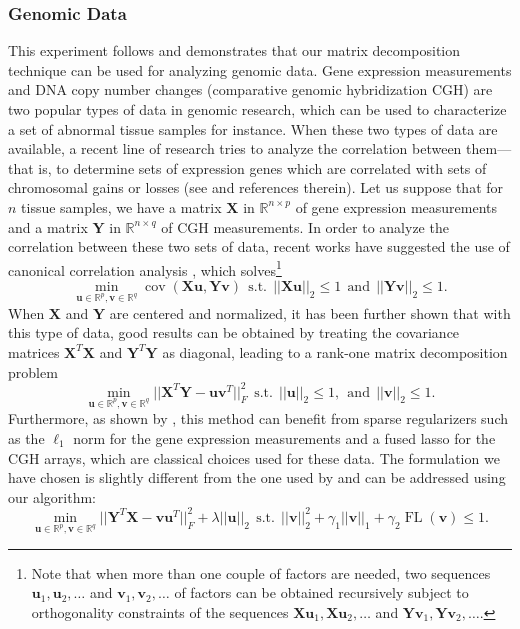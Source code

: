 \documentclass[twoside,11pt]{article}
\def\v{{\mathbf v}}
\def\X{{\mathbf X}}
\def\Y{{\mathbf Y}}
\def\u{{\mathbf u}}
\def\Real{{\mathbb R}}
\def\u{{\mathbf u}}
\def\FL{\operatorname{FL}}
\def\cov{\operatorname{cov}}
\def\st{~~\text{s.t.}~~}
\begin{document}
\subsubsection{Genomic Data}
This experiment follows \citet{witten} and demonstrates that our matrix
decomposition technique can be used for analyzing genomic data.
Gene expression measurements and DNA copy number changes (comparative genomic hybridization CGH) are two popular
types of data in genomic research, which can be used to characterize
a set of abnormal tissue samples for instance.
When these two types of data are available, a recent line of research
tries to analyze the correlation between them---that is, to determine
sets of expression genes which are correlated with sets of chromosomal
gains or losses (see \citealp{witten} and references therein).
Let us suppose that for $n$ tissue samples, we have a matrix $\X$ in $\Real^{n
\times p}$ of gene expression measurements and a matrix $\Y$ in $\Real^{n
\times q}$ of CGH measurements. In order to analyze the
correlation between these two sets of data, recent works have suggested the
use of canonical correlation analysis \citep{hotelling}, which
solves\footnote{Note that when more than one couple of factors are needed, two
sequences
$\u_1,\u_2,\ldots$ and $\v_1,\v_2,\ldots$ of factors can be obtained
recursively subject to orthogonality constraints of the sequences
$\X\u_1,\X\u_2,\ldots$ and $\Y\v_1,\Y\v_2,\ldots$.}
\begin{displaymath}
   \min_{\u \in \Real^p, \v \in \Real^q} \cov(\X\u,\Y\v) \st ||\X\u||_2 \leq 1
   ~~\text{and}~~ ||\Y\v||_2 \leq 1.
\end{displaymath}
When $\X$ and $\Y$ are centered and normalized, it has been further shown that
with this type of data, good results can be obtained by treating the
covariance matrices $\X^T\X$ and $\Y^T\Y$ as diagonal, leading to a rank-one
matrix decomposition problem 
\begin{displaymath}
   \min_{\u \in \Real^p, \v \in \Real^q} ||\X^T\Y-\u\v^T||_F^2 \st ||\u||_2 \leq
   1,~~\text{and}~~ ||\v||_2 \leq 1.
\end{displaymath}
Furthermore, as shown by \citet{witten}, this method can benefit from
sparse regularizers such as the $\ell_1$ norm for the gene expression
measurements and a fused lasso for the CGH arrays, which are classical
choices used for these data. The formulation we have chosen is slightly different 
from the one used by \citet{witten} and can be addressed using our algorithm:
\begin{equation}
   \min_{\u \in \Real^p, \v \in \Real^q} ||\Y^T\X-\v\u^T||_F^2 + \lambda ||\u||_2 
   \st ||\v||_2^2 + \gamma_1||\v||_1 + \gamma_2 \FL(\v) \leq 1.\label{eq:cancer}
\end{equation}
\end{document}
